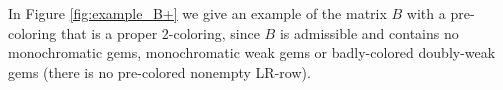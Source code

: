 \documentclass[12pt]{book}
\theoremstyle{plain}
\newtheorem{lema}[teo]{Lemma}
\theoremstyle{remark}
\begin{document}
\begin{comment}

This lemma follows easily from the definition. 
\begin{lema} \label{lema:properforA_isproperforA+}
	A proper $2$-coloring of $A$ always induces a proper $2$-coloring of $A+$.
\end{lema}

\begin{proof}
Suppose there is a proper $2$-coloring for $A$. Hence, there are no monochromatic gems or monochromatic weak gems or badly-colored doubly-weak gems in $A$.
In particular, there are no monochromatic gems or monochromatic weak gems in $A$ induced by non-LR-rows. 

Notice that, if the L-block and R-block of each LR-row are colored with distinct colors, then in particular there are no monochromatic weak gems in $A+$ induced by some L-row and R-row corresponding to the same LR-row, given that we added the column $c_f$ for each split LR-row $f$. 
Hence, there is no monochromatic gem induced by two former LR-rows since in that case either the LR-ordering is not suitable or there is a badly-colored doubly-weak gem in $A$.
Similarly, if there is a weak monochromatic gem in $A+$ induced by one or more former LR-rows and at most one $c_r$ column, then either we had a monochromatic weak gem in $A$ or the LR-ordering used to define $A+$ is not suitable.


Since $A+$ contains no LR-rows, there are no badly colored doubly-weak gems in $A+$. 
Moreover, there is no monochromatic gem induced by an LR-row and a non-LR-row, for in that case there is either a monochromatic gem in $A$ or the LR-ordering used to define $A+$ is not suitable. 

Furthermore, there are no LR-rows in $A+$, thus there are no subconfigurations as in $\mathcal{D}$ or $\mathcal{S}$ or $\mathcal{P}$ induced by non-LR-rows and LR-rows. 
Since the LR-ordering used to define $A+$ is suitable and $A+ \setminus C_f$ is LR-orderable, there are no $D_0$, $D_1$, $D_2$, $S_2(k)$ or $S_3(k)$ induced by one or more former LR-rows, therefore $A+ \setminus C_r$ is admissible.
\end{proof}


\end{comment}


In Figure \ref{fig:example_B+} we give an example of the matrix $B$ with a pre-coloring that is a proper $2$-coloring, since $B$ is admissible and contains no monochromatic gems, monochromatic weak gems or badly-colored doubly-weak gems (there is no pre-colored nonempty LR-row). 
\end{document}

